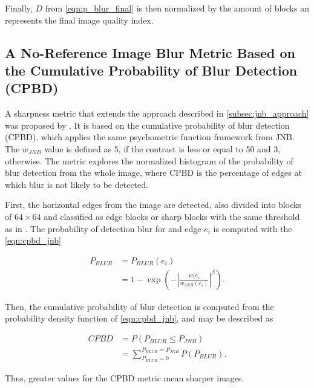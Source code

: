 \noindent Finally, $D$ from \autoref{eqn:p_blur_final} is then normalized by the amount of blocks an represents the final image quality index.

\subsection{A No-Reference Image Blur Metric Based on the Cumulative Probability of Blur Detection (CPBD)}

A sharpness metric that extends the approach described in \ref{subsec:jnb_approach} was proposed by . It is based on the cumulative probability of blur detection (CPBD), which applies the same psychometric function framework from JNB. The $w_{JNB}$ value is defined as 5, if the contrast is less or equal to 50 and 3, otherwise. The metric explores the normalized histogram of the probability of blur detection from the whole image, where CPBD is the percentage of edges at which blur is not likely to be detected.

First, the horizontal edges from the image are detected, also divided into blocks of $64 \times 64$ and classified as edge blocks or sharp blocks with the same threshold as in . The probability of detection blur for and edge $e_{i}$ is computed with the \autoref{eqn:cpbd_jnb}

\begin{equation}
\label{eqn:cpbd_jnb}
\begin{split}
    P_{BLUR} &= P_{BLUR}(e_{i})\\
    &= 1 - \exp{
    \left(
        - \left|
            \frac{w(e_{i}}{w_{JNB}(e_{i})}
        \right|^\beta
    \right)}.
\end{split}
\end{equation}

\noindent Then, the cumulative probability of blur detection is computed from the probability density function of \autoref{eqn:cpbd_jnb}, and may be described as

\begin{equation}
\label{eqn:cpbd}
\begin{split}
    CPBD &= P(P_{BLUR} \leq P_{JNB})\\
    &=\sum_{P_{BLUR} = 0}^{P_{BLUR} = P_{JNB}}P(P_{BLUR}).
\end{split}
\end{equation}

\noindent Thus, greater values for the CPBD metric mean sharper images.


